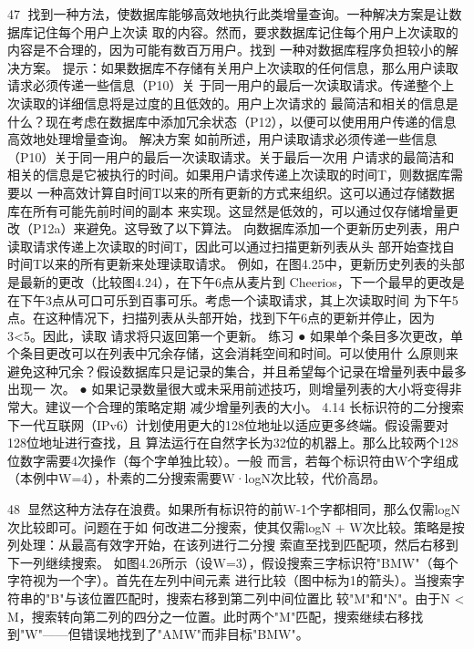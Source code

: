                                                   47
找到一种方法，使数据库能够高效地执行此类增量查询。一种解决方案是让数据库记住每个用户上次读
取的内容。然而，要求数据库记住每个用户上次读取的内容是不合理的，因为可能有数百万用户。找到
一种对数据库程序负担较小的解决方案。
提示：如果数据库不存储有关用户上次读取的任何信息，那么用户读取请求必须传递一些信息（P10）关
于同一用户的最后一次读取请求。传递整个上次读取的详细信息将是过度的且低效的。用户上次请求的
最简洁和相关的信息是什么？现在考虑在数据库中添加冗余状态（P12），以便可以使用用户传递的信息
高效地处理增量查询。
解决方案
如前所述，用户读取请求必须传递一些信息（P10）关于同一用户的最后一次读取请求。关于最后一次用
户请求的最简洁和相关的信息是它被执行的时间。如果用户请求传递上次读取的时间T，则数据库需要以
一种高效计算自时间T以来的所有更新的方式来组织。这可以通过存储数据库在所有可能先前时间的副本
来实现。这显然是低效的，可以通过仅存储增量更改（P12a）来避免。这导致了以下算法。
向数据库添加一个更新历史列表，用户读取请求传递上次读取的时间T，因此可以通过扫描更新列表从头
部开始查找自时间T以来的所有更新来处理读取请求。
例如，在图4.25中，更新历史列表的头部是最新的更改（比较图4.24），在下午6点从麦片到
Cheerios，下一个最早的更改是在下午3点从可口可乐到百事可乐。考虑一个读取请求，其上次读取时间
为下午5点。在这种情况下，扫描列表从头部开始，找到下午6点的更新并停止，因为3<5。因此，读取
请求将只返回第一个更新。
练习
● 如果单个条目多次更改，单个条目更改可以在列表中冗余存储，这会消耗空间和时间。可以使用什
  么原则来避免这种冗余？假设数据库只是记录的集合，并且希望每个记录在增量列表中最多出现一
  次。
● 如果记录数量很大或未采用前述技巧，则增量列表的大小将变得非常大。建议一个合理的策略定期
  减少增量列表的大小。
4.14 长标识符的二分搜索
下一代互联网（IPv6）计划使用更大的128位地址以适应更多终端。假设需要对128位地址进行查找，且
算法运行在自然字长为32位的机器上。那么比较两个128位数字需要4次操作（每个字单独比较）。一般
而言，若每个标识符由W个字组成（本例中W=4），朴素的二分搜索需要W·logN次比较，代价高昂。


                                                 48
显然这种方法存在浪费。如果所有标识符的前W-1个字都相同，那么仅需logN次比较即可。问题在于如
何改进二分搜索，使其仅需logN + W次比较。策略是按列处理：从最高有效字开始，在该列进行二分搜
索直至找到匹配项，然后右移到下一列继续搜索。
如图4.26所示（设W=3），假设搜索三字标识符"BMW"（每个字符视为一个字）。首先在左列中间元素
进行比较（图中标为1的箭头）。当搜索字符串的"B"与该位置匹配时，搜索右移到第二列中间位置比
较"M"和"N"。由于N < M，搜索转向第二列的四分之一位置。此时两个"M"匹配，搜索继续右移找
到"W"——但错误地找到了"AMW"而非目标"BMW"。




